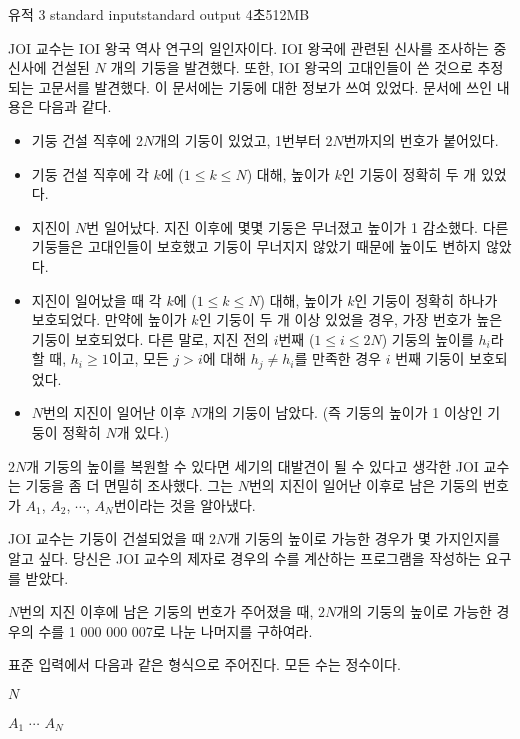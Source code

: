 \begin{problem}{유적 3}
	{standard input}{standard output}
	{4초}{512MB}{}
	
	JOI 교수는 IOI 왕국 역사 연구의 일인자이다. IOI 왕국에 관련된 신사를 조사하는 중 신사에 건설된 $N$ 개의 기둥을 발견했다. 또한, IOI 왕국의 고대인들이 쓴 것으로 추정되는 고문서를 발견했다. 이 문서에는 기둥에 대한 정보가 쓰여 있었다. 문서에 쓰인 내용은 다음과 같다.
	
	\begin{itemize}
		\item 기둥 건설 직후에 $2N$개의 기둥이 있었고, 1번부터 $2N$번까지의 번호가 붙어있다.
		\item 기둥 건설 직후에 각 $k$에 ($1 \le k \le N$) 대해, 높이가 $k$인 기둥이 정확히 두 개 있었다.
		\item 지진이 $N$번 일어났다. 지진 이후에 몇몇 기둥은 무너졌고 높이가 1 감소했다. 다른 기둥들은 고대인들이 보호했고 기둥이 무너지지 않았기 때문에 높이도 변하지 않았다.
		\item 지진이 일어났을 때 각 $k$에 ($1 \le k \le N$) 대해, 높이가 $k$인 기둥이 정확히 하나가 보호되었다. 만약에 높이가 $k$인 기둥이 두 개 이상 있었을 경우, 가장 번호가 높은 기둥이 보호되었다. 다른 말로, 지진 전의 $i$번째 ($1 \le i \le 2N$) 기둥의 높이를 $h_i$라 할 때, $h_i \ge 1$이고, 모든 $j>i$에 대해 $h_j \ne h_i$를 만족한 경우 $i$ 번째 기둥이 보호되었다.
		\item $N$번의 지진이 일어난 이후 $N$개의 기둥이 남았다. (즉 기둥의 높이가 1 이상인 기둥이 정확히 $N$개 있다.)
	\end{itemize}

	$2N$개 기둥의 높이를 복원할 수 있다면 세기의 대발견이 될 수 있다고 생각한 JOI 교수는 기둥을 좀 더 면밀히 조사했다. 그는 $N$번의 지진이 일어난 이후로 남은 기둥의 번호가 $A_1$, $A_2$, $\cdots$, $A_N$번이라는 것을 알아냈다.
	
	JOI 교수는 기둥이 건설되었을 때 $2N$개 기둥의 높이로 가능한 경우가 몇 가지인지를 알고 싶다. 당신은 JOI 교수의 제자로 경우의 수를 계산하는 프로그램을 작성하는 요구를 받았다.
	
	$N$번의 지진 이후에 남은 기둥의 번호가 주어졌을 때, $2N$개의 기둥의 높이로 가능한 경우의 수를 1 000 000 007로 나눈 나머지를 구하여라.
	
	\InputFile
	
	표준 입력에서 다음과 같은 형식으로 주어진다. 모든 수는 정수이다.
	
	$N$
	
	$A_1$ $\cdots$ $A_N$
	
	\OutputFile
	

\end{problem}
